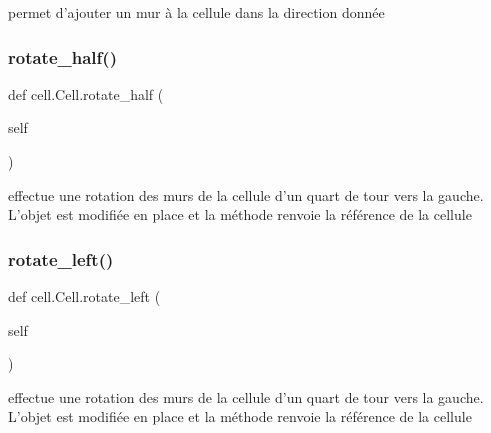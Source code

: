 \begin{DoxyVerb}permet d'ajouter un mur à la cellule dans la direction donnée
\end{DoxyVerb}
 \mbox{\label{classcell_1_1Cell_a85bf248bab5f2fb81ab4498ec025e138}} 
\subsubsection{\texorpdfstring{rotate\+\_\+half()}{rotate\_half()}}
{\footnotesize\ttfamily def cell.\+Cell.\+rotate\+\_\+half (\begin{DoxyParamCaption}\item[{}]{self }\end{DoxyParamCaption})}

\begin{DoxyVerb}effectue une rotation des murs de la cellule d'un quart de tour vers la gauche.
L'objet est modifiée en place et  la méthode renvoie la référence de la cellule
\end{DoxyVerb}
 \mbox{\label{classcell_1_1Cell_afe4fd9eff1237decc36d388600897f75}} 
\subsubsection{\texorpdfstring{rotate\+\_\+left()}{rotate\_left()}}
{\footnotesize\ttfamily def cell.\+Cell.\+rotate\+\_\+left (\begin{DoxyParamCaption}\item[{}]{self }\end{DoxyParamCaption})}

\begin{DoxyVerb}effectue une rotation des murs de la cellule d'un quart de tour vers la gauche.
L'objet est modifiée en place et  la méthode renvoie la référence de la cellule
\end{DoxyVerb}
 \mbox{\label{classcell_1_1Cell_a46fe2e7a6559049679f9e93e13abea79}} 
